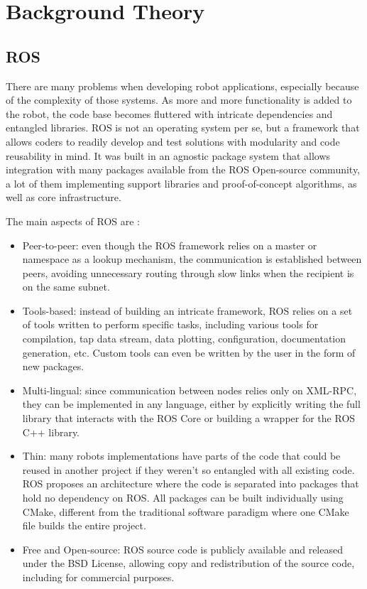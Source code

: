 \chapter{Background Theory}\label{chp:fundament}

\section{ROS}

There are many problems when developing robot applications, especially because of the complexity of those systems. As more and more functionality is added to the robot, the code base becomes fluttered with intricate dependencies and entangled libraries. ROS is not an operating system per se, but a framework that allows coders to readily develop and test solutions with modularity and code reusability in mind. It was built in an agnostic package system that allows integration with many packages available from the ROS Open-source community, a lot of them implementing support libraries and proof-of-concept algorithms, as well as core infrastructure.

The main aspects of ROS are \cite{quigley2009ros}:

\begin{itemize}
\item Peer-to-peer: even though the ROS framework relies on a master or namespace as a lookup mechanism, the communication is established between peers, avoiding unnecessary routing through slow links when the recipient is on the same subnet.
\item Tools-based: instead of building an intricate framework, ROS relies on a set of tools written to perform specific tasks, including various tools for compilation, tap data stream, data plotting, configuration, documentation generation, etc. Custom tools can even be written by the user in the form of new packages.
\item Multi-lingual: since communication between nodes relies only on XML-RPC, they can be implemented in any language, either by explicitly writing the full library that interacts with the ROS Core or building a wrapper for the ROS C++ library.
\item Thin: many robots implementations have parts of the code that could be reused in another project if they weren't so entangled with all existing code. ROS proposes an architecture where the code is separated into packages that hold no dependency on ROS. All packages can be built individually using CMake, different from the traditional software paradigm where one CMake file builds the entire project.
\item Free and Open-source: ROS source code is publicly available and released under the BSD License, allowing copy and redistribution of the source code, including for commercial purposes.
\end{itemize}

